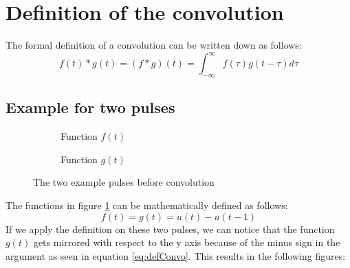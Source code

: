 \documentclass[]{subfiles}
\begin{document}
	\section{Definition of the convolution}
	The formal definition of a convolution can be written down as follows:
	\begin{equation}
		\label{eq:defConvo}
		f(t)\ast g(t) = (f\ast g)(t) = \int_{-\infty}^{\infty} f(\tau) g(t-\tau) d\tau
	\end{equation}
\subsection{Example for two pulses}
\begin{figure}[h]
	\centering
	\begin{subfigure}{.4\textwidth}
		\begin{center}
		\end{center}
	\caption{Function $f(t)$}
	\end{subfigure}%
	\begin{subfigure}{.4\textwidth}
		\begin{center}
		\end{center}
	\caption{Function $g(t)$}
	\end{subfigure}
\caption{The two example pulses before convolution}
\label{fig:convoVoorbeeld}
\end{figure}
The functions in figure \ref{fig:convoVoorbeeld} can be mathematically defined as follows:
\begin{equation}
	f(t) = g(t) = u(t)-u(t-1)
\end{equation}
If we apply the definition on these two pulses, we can notice that the function $g(t)$ gets mirrored with respect to the y axis because of the minus sign in the argument as seen in equation \ref{eq:defConvo}. This results in the following figures:  \\
\end{document}

